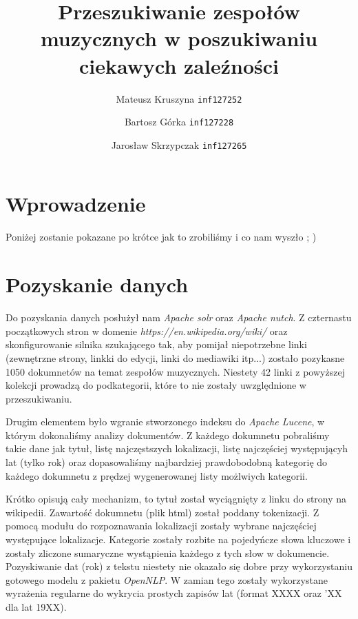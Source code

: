 \documentclass[journal]{IEEEtran}
\begin{document}
\title{Przeszukiwanie zespołów muzycznych w poszukiwaniu ciekawych zaleźności}
\author{
    Mateusz Kruszyna \texttt{inf127252}\\
    \and
    Bartosz Górka \texttt{inf127228}\\
    \and
    Jarosław Skrzypczak \texttt{inf127265}
}
\maketitle
\IEEEpeerreviewmaketitle

\section{Wprowadzenie}
Poniżej zostanie pokazane po krótce jak to zrobiliśmy i co nam wyszło ; )

\section{Pozyskanie danych}
Do pozyskania danych posłużył nam \textit{Apache solr} oraz \textit{Apache nutch}.
Z czternastu początkowych stron w domenie \textit{https://en.wikipedia.org/wiki/}
oraz skonfigurowanie silnika szukającego tak, aby pomijał niepotrzebne linki
(zewnętrzne strony, linkki do edycji, linki do mediawiki itp...)
zostało pozykasne 1050 dokumnetów na temat zespołów muzycznych.
Niestety 42 linki z powyższej kolekcji prowadzą do podkategorii, które to nie zostały
uwzględnione w przeszukiwaniu.

Drugim elementem było wgranie stworzonego indeksu do \textit{Apache Lucene}, w którym
dokonaliśmy analizy dokumentów. Z każdego dokumnetu pobraliśmy takie dane jak tytuł,
listę najczęstszych lokalizacji, listę najczęściej występującyh lat (tylko rok) oraz
dopasowaliśmy najbardziej prawdobodobną kategorię do każdego dokumnetu
z prędzej wygenerowanej listy możlwiych kategorii.

Krótko opisują cały mechanizm, to tytuł został wyciągnięty z linku do strony na wikipedii.
Zawartość dokumnetu (plik html) został poddany tokenizacji.
Z pomocą modułu do rozpoznawania lokalizacji zostały wybrane najczęściej występujące lokalizacje.
Kategorie zostały rozbite na pojedyńcze słowa kluczowe i zostały zliczone
sumaryczne wystąpienia każdego z tych słow w dokumencie.
Pozyskiwanie dat (rok) z tekstu niestety nie okazało się dobre przy wykorzystaniu gotowego modelu
z pakietu \textit{OpenNLP}. W zamian tego zostały wykorzystane wyrażenia regularne
do wykrycia prostych zapisów lat (format XXXX oraz 'XX dla lat 19XX).
\end{document}
